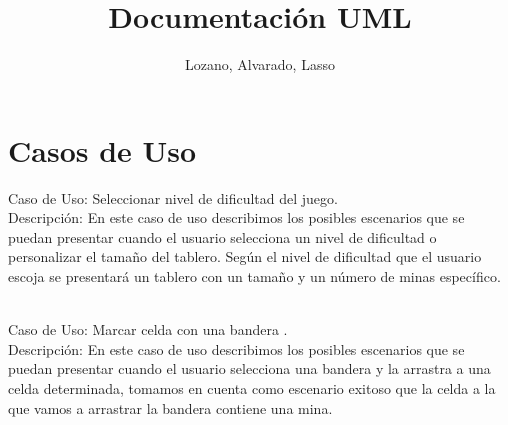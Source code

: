 \documentclass[11pt]{article} %
\title{Documentación UML }
\author{Lozano, Alvarado, Lasso}
\begin{document}
\maketitle

\section{Casos de Uso}


Caso de Uso: Seleccionar nivel de dificultad del juego. 
\\Descripción: 
En este caso de uso describimos los posibles escenarios que se puedan presentar cuando el usuario selecciona un nivel de dificultad o personalizar el tamaño del tablero.
Según el nivel de dificultad que el usuario escoja se presentará un tablero con un tamaño y un número de minas específico.\
\\  \
 
Caso de Uso: Marcar celda con una bandera . 
\\Descripción: 
En este caso de uso describimos los posibles escenarios que se puedan presentar cuando el usuario selecciona una bandera y la arrastra a una celda determinada, tomamos en cuenta como escenario exitoso que la celda a la que vamos a arrastrar la bandera contiene una mina.\
\\ \
\end{document}
